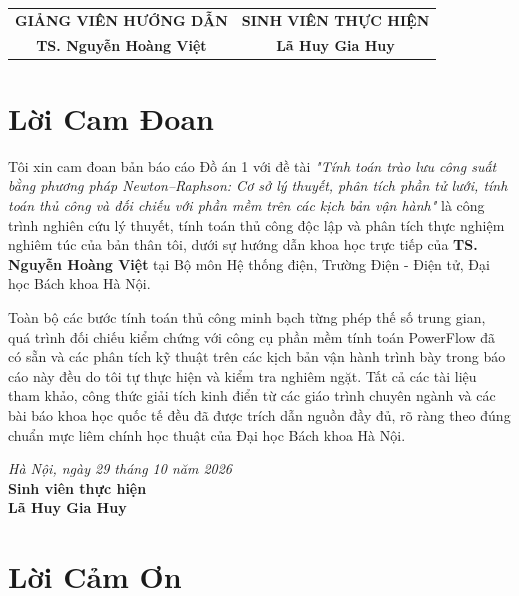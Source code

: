 \documentclass[12pt,a4paper,oneside]{report}
\begin{document}
\vspace{1.5cm}
\noindent \begin{tabular*}{\textwidth}{@{\extracolsep{\fill}}cc}
    \textbf{GIẢNG VIÊN HƯỚNG DẪN} & \textbf{SINH VIÊN THỰC HIỆN} \\[30pt]
    \textbf{TS. Nguyễn Hoàng Việt} & \textbf{Lã Huy Gia Huy}
\end{tabular*}

\newpage

\chapter*{Lời Cam Đoan}

Tôi xin cam đoan bản báo cáo Đồ án 1 với đề tài \textit{"Tính toán trào lưu công suất bằng phương pháp Newton--Raphson: Cơ sở lý thuyết, phân tích phần tử lưới, tính toán thủ công và đối chiếu với phần mềm trên các kịch bản vận hành"} là công trình nghiên cứu lý thuyết, tính toán thủ công độc lập và phân tích thực nghiệm nghiêm túc của bản thân tôi, dưới sự hướng dẫn khoa học trực tiếp của \textbf{TS. Nguyễn Hoàng Việt} tại Bộ môn Hệ thống điện, Trường Điện - Điện tử, Đại học Bách khoa Hà Nội.

Toàn bộ các bước tính toán thủ công minh bạch từng phép thế số trung gian, quá trình đối chiếu kiểm chứng với công cụ phần mềm tính toán PowerFlow đã có sẵn và các phân tích kỹ thuật trên các kịch bản vận hành trình bày trong báo cáo này đều do tôi tự thực hiện và kiểm tra nghiêm ngặt. Tất cả các tài liệu tham khảo, công thức giải tích kinh điển từ các giáo trình chuyên ngành và các bài báo khoa học quốc tế đều đã được trích dẫn nguồn đầy đủ, rõ ràng theo đúng chuẩn mực liêm chính học thuật của Đại học Bách khoa Hà Nội.

\vspace{1.5cm}
\begin{flushright}
    \textit{Hà Nội, ngày 29 tháng 10 năm 2026}\\[5pt]
    \textbf{Sinh viên thực hiện}\\[30pt]
    \textbf{Lã Huy Gia Huy}
\end{flushright}

\newpage

\chapter*{Lời Cảm Ơn}
\end{document}
